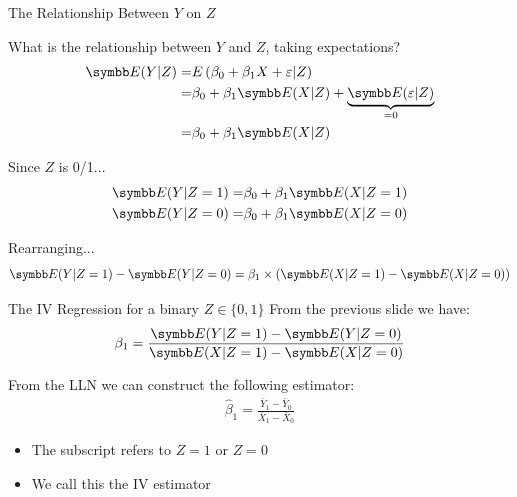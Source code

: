 \documentclass[aspectratio=169,11pt]{beamer}
\begin{document}
\begin{frame}{The Relationship Between $Y$ on $Z$}

What is the relationship between $Y$ and $Z$, taking expectations?
\begin{align*}
		\E(Y|Z) =& E\left(\beta_0 + \beta_1 X + \varepsilon| Z\right)\\
			   =& \beta_0 + \beta_1 \E(X|Z) + \underbrace{\E(\varepsilon|Z)}_{=0}\\
			   =&\beta_0 + \beta_1 \E(X|Z)
\end{align*}

Since $Z$ is 0/1... 
\begin{align*}
	\E(Y|Z=1) =& \beta_0 + \beta_1 \E(X|Z=1)\\
	\E(Y|Z=0) =& \beta_0 + \beta_1 \E(X|Z=0)
\end{align*}

Rearranging... 
\begin{align*}
	\E(Y|Z=1)-\E(Y|Z=0) = \beta_1\times\left(\E(X|Z=1)-\E(X|Z=0)\right)
\end{align*}
\end{frame}

\begin{frame}{The IV Regression for a binary $Z \in\{0,1\}$}
From the previous slide we have:
\begin{align*}
	\beta_1 = \frac{\E(Y|Z=1)-\E(Y|Z=0)}{\E(X|Z=1)-\E(X|Z=0)}
\end{align*}


From the LLN we can construct the following estimator:
\begin{align*}
	\hat\beta_1 = \frac{\bar Y_1 - \bar Y_0}{\bar X_1 - \bar X_0}
\end{align*}
\begin{itemize}
	\item The subscript refers to $Z=1$ or $Z=0$
	\item We call this the IV estimator
\end{itemize}
\end{frame}
\end{document}
